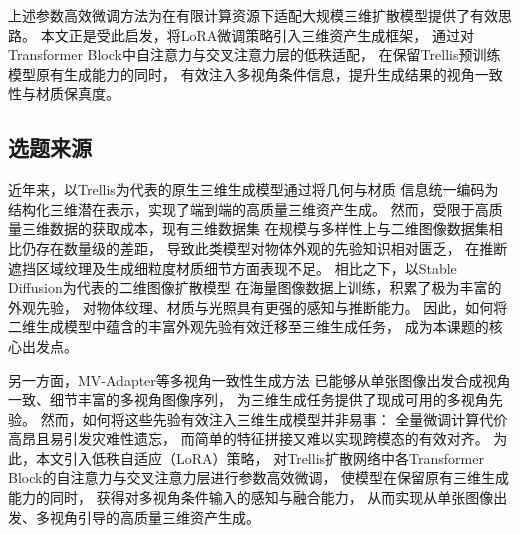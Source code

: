 上述参数高效微调方法为在有限计算资源下适配大规模三维扩散模型提供了有效思路。
本文正是受此启发，将LoRA微调策略引入三维资产生成框架，
通过对Transformer Block中自注意力与交叉注意力层的低秩适配，
在保留Trellis\cite{xiang2025structured}预训练模型原有生成能力的同时，
有效注入多视角条件信息，提升生成结果的视角一致性与材质保真度。

\subsection{选题来源}

近年来，以Trellis\cite{xiang2025structured}为代表的原生三维生成模型通过将几何与材质
信息统一编码为结构化三维潜在表示，实现了端到端的高质量三维资产生成。
然而，受限于高质量三维数据的获取成本，现有三维数据集\cite{deitke2023objaverse}
在规模与多样性上与二维图像数据集相比仍存在数量级的差距，
导致此类模型对物体外观的先验知识相对匮乏，
在推断遮挡区域纹理及生成细粒度材质细节方面表现不足。
相比之下，以Stable Diffusion\cite{rombach2022high}为代表的二维图像扩散模型
在海量图像数据上训练，积累了极为丰富的外观先验，
对物体纹理、材质与光照具有更强的感知与推断能力。
因此，如何将二维生成模型中蕴含的丰富外观先验有效迁移至三维生成任务，
成为本课题的核心出发点。

另一方面，MV-Adapter\cite{huang2025mv}等多视角一致性生成方法
已能够从单张图像出发合成视角一致、细节丰富的多视角图像序列，
为三维生成任务提供了现成可用的多视角先验。
然而，如何将这些先验有效注入三维生成模型并非易事：
全量微调计算代价高昂且易引发灾难性遗忘\cite{kirkpatrick2017overcoming}，
而简单的特征拼接又难以实现跨模态的有效对齐。
为此，本文引入低秩自适应（LoRA）\cite{hu2022lora}策略，
对Trellis扩散网络中各Transformer Block的自注意力与交叉注意力层进行参数高效微调，
使模型在保留原有三维生成能力的同时，
获得对多视角条件输入的感知与融合能力，
从而实现从单张图像出发、多视角引导的高质量三维资产生成。

